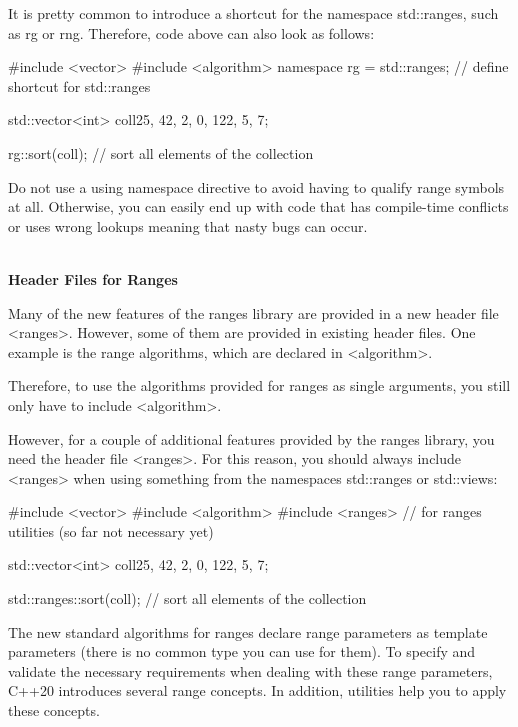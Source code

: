 It is pretty common to introduce a shortcut for the namespace std::ranges, such as rg or rng. Therefore, code above can also look as follows:

\begin{cpp}
#include <vector>
#include <algorithm>
namespace rg = std::ranges; // define shortcut for std::ranges

std::vector<int> coll{25, 42, 2, 0, 122, 5, 7};

rg::sort(coll); // sort all elements of the collection
\end{cpp}

Do not use a using namespace directive to avoid having to qualify range symbols at all. Otherwise, you can easily end up with code that has compile-time conflicts or uses wrong lookups meaning that nasty bugs can occur.

\noindent
\hspace*{\fill} \\ %
\textbf{Header Files for Ranges}

Many of the new features of the ranges library are provided in a new header file <ranges>. However, some of them are provided in existing header files. One example is the range algorithms, which are declared in <algorithm>.

Therefore, to use the algorithms provided for ranges as single arguments, you still only have to include <algorithm>.

However, for a couple of additional features provided by the ranges library, you need the header file <ranges>. For this reason, you should always include <ranges> when using something from the namespaces std::ranges or std::views:

\begin{cpp}
#include <vector>
#include <algorithm>
#include <ranges> // for ranges utilities (so far not necessary yet)

std::vector<int> coll{25, 42, 2, 0, 122, 5, 7};

std::ranges::sort(coll); // sort all elements of the collection
\end{cpp}


The new standard algorithms for ranges declare range parameters as template parameters (there is no common type you can use for them). To specify and validate the necessary requirements when dealing with these range parameters, C++20 introduces several range concepts. In addition, utilities help you to apply these concepts.

